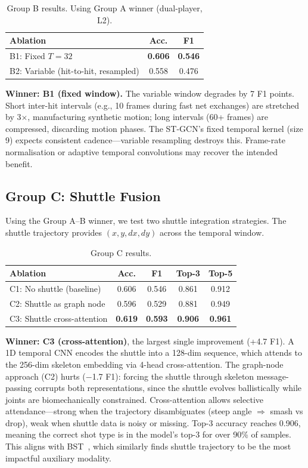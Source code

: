 \documentclass[11pt,a4paper]{article}
\begin{document}
\begin{table}[H]
\centering
\caption{Group B results. Using Group A winner (dual-player, L2).}
\label{tab:groupB}
\begin{tabular}{@{}lcc@{}}
\toprule
\textbf{Ablation} & \textbf{Acc.} & \textbf{F1} \\
\midrule
B1: Fixed $T=32$ & \textbf{0.606} & \textbf{0.546} \\
B2: Variable (hit-to-hit, resampled) & 0.558 & 0.476 \\
\bottomrule
\end{tabular}
\end{table}

\textbf{Winner: B1 (fixed window).} The variable window degrades by 7 F1 points. Short inter-hit intervals (e.g., 10 frames during fast net exchanges) are stretched by 3$\times$, manufacturing synthetic motion; long intervals (60+ frames) are compressed, discarding motion phases. The ST-GCN's fixed temporal kernel (size 9) expects consistent cadence---variable resampling destroys this. Frame-rate normalisation or adaptive temporal convolutions may recover the intended benefit.

\subsection{Group C: Shuttle Fusion}

Using the Group A--B winner, we test two shuttle integration strategies. The shuttle trajectory provides $(x, y, dx, dy)$ across the temporal window.

\begin{table}[H]
\centering
\caption{Group C results.}
\label{tab:groupC}
\begin{tabular}{@{}lcccc@{}}
\toprule
\textbf{Ablation} & \textbf{Acc.} & \textbf{F1} & \textbf{Top-3} & \textbf{Top-5} \\
\midrule
C1: No shuttle (baseline) & 0.606 & 0.546 & 0.861 & 0.912 \\
C2: Shuttle as graph node & 0.596 & 0.529 & 0.881 & 0.949 \\
C3: Shuttle cross-attention & \textbf{0.619} & \textbf{0.593} & \textbf{0.906} & \textbf{0.961} \\
\bottomrule
\end{tabular}
\end{table}

\textbf{Winner: C3 (cross-attention)}, the largest single improvement (+4.7 F1). A 1D temporal CNN encodes the shuttle into a 128-dim sequence, which attends to the 256-dim skeleton embedding via 4-head cross-attention. The graph-node approach (C2) hurts ($-$1.7 F1): forcing the shuttle through skeleton message-passing corrupts both representations, since the shuttle evolves ballistically while joints are biomechanically constrained. Cross-attention allows selective attendance---strong when the trajectory disambiguates (steep angle $\Rightarrow$ smash vs drop), weak when shuttle data is noisy or missing. Top-3 accuracy reaches 0.906, meaning the correct shot type is in the model's top-3 for over 90\% of samples. This aligns with BST~\cite{bst}, which similarly finds shuttle trajectory to be the most impactful auxiliary modality.
\end{document}
